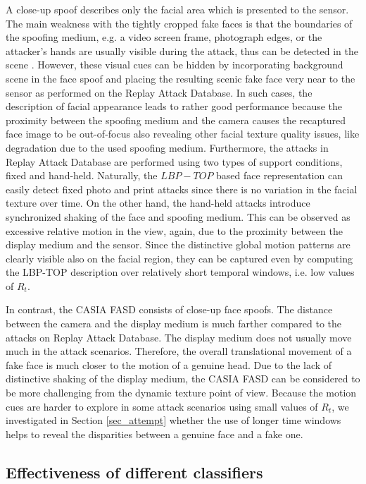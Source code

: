 A close-up spoof describes only the facial area which is presented to the sensor. The main weakness with the tightly cropped fake faces is that the boundaries of the spoofing medium, e.g. a video screen frame, photograph edges, or the attacker's hands are usually visible during the attack, thus can be detected in the scene \cite{JukkaLBP2012}. However, these visual cues can be hidden by incorporating background scene in the face spoof and placing the resulting scenic fake face very near to the sensor as performed on the Replay Attack Database. In such cases, the description of facial appearance leads to rather good performance because the proximity between the spoofing medium and the camera causes the recaptured face image to be out-of-focus also revealing other facial texture quality issues, like degradation due to the used spoofing medium. Furthermore, the attacks in Replay Attack Database are performed using two types of support conditions, fixed and hand-held. Naturally, the $LBP-TOP$ based face representation can easily detect fixed photo and print attacks since there is no variation in the facial texture over time. On the other hand, the hand-held attacks introduce synchronized shaking of the face and spoofing medium. This can be observed as excessive relative motion in the view, again, due to the proximity between the display medium and the sensor. Since the distinctive global motion patterns are clearly visible also on the facial region, they can be captured even by computing the LBP-TOP description over relatively short temporal windows, i.e. low values of $R_t$.

In contrast, the CASIA FASD consists of close-up face spoofs. The distance between the camera and the display medium is much farther compared to the attacks on Replay Attack Database. The display medium does not usually move much in the attack scenarios. Therefore, the overall translational movement of a fake face is much closer to the motion of a genuine head. Due to the lack of distinctive shaking of the display medium, the CASIA FASD can be considered to be more challenging from the dynamic texture point of view. Because the motion cues are harder to explore in some attack scenarios using small values of $R_t$, we investigated in Section \ref{sec_attempt} whether the use of longer time windows helps to reveal the disparities between a genuine face and a fake one.


\subsection{Effectiveness of different classifiers}
\label{sec_different_classifiers}

